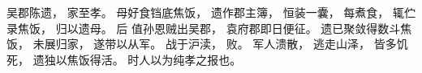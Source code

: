 
\switchcolumn*[\section{}]

吴郡陈遗，
家至孝。
母好食铛底焦饭，
遗作郡主簿，
恒装一囊，
每煮食，
辄伫录焦饭，
归以遗母。
后
值孙恩贼出吴郡，
袁府郡即日便征。
遗已聚敛得数斗焦饭，
未展归家，
遂带以从军。
战于沪渎，
败。
军人溃散，
逃走山泽，
皆多饥死，
遗独以焦饭得活。
时人以为纯孝之报也。

\switchcolumn



